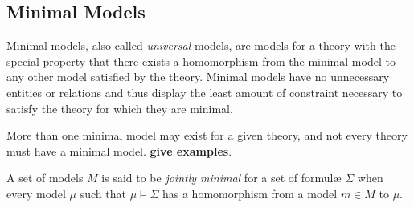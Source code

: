 	\subsection{Minimal Models}

		Minimal models, also called \emph{universal} models, are models for a
		theory with the special property that there exists a homomorphism from
		the minimal model to any other model satisfied by the theory. Minimal
		models have no unnecessary entities or relations and thus display the
		least amount of constraint necessary to satisfy the theory for which
		they are minimal.

		More than one minimal model may exist for a given theory, and not every
		theory must have a minimal model. \textbf{give examples}.

		A set of models $M$ is said to be \emph{jointly minimal} for a set of
		formul{\ae} $\Sigma$ when every model $\mu$ such that $\mu \models
		\Sigma$ has a homomorphism from a model $m \in M$ to $\mu$.
